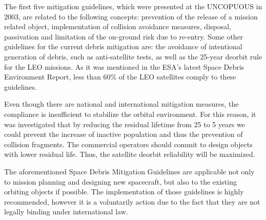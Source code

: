 The first five mitigation guidelines, which were presented at the UNCOPUOUS in 2003, are related to the following concepts: prevention of the release of a mission related object, implementation of collision avoidance measures, disposal, passivation and limitation of the on-ground risk due to re-entry. Some other guidelines for the current debris mitigation are: the avoidance of intentional generation of debris, such as anti-satellite tests, as well as the 25-year deorbit rule for the LEO missions. As it was mentioned in the ESA's latest Space Debris Environment Report, less than 60\% of the LEO satellites comply to these guidelines. \cite{ESA 2020} %

Even though there are national and international mitigation measures, the compliance is insufficient to stabilize the orbital environment. For this reason, it was investigated that by reducing the residual lifetime from 25 to 5 years we could prevent the increase of inactive population and thus the prevention of collision fragments. The commercial operators should commit to design objects with lower residual life. Thus, the satellite deorbit reliability will be maximized. \cite{Somma 2019}

The aforementioned Space Debris Mitigation Guidelines are applicable not only to mission planning and designing new spacecraft, but also to the existing orbiting objects if possible. The implementation of those guidelines is highly recommended, however it is a voluntarily action due to the fact that they are not legally binding under international law. \cite{UNOOSA}

